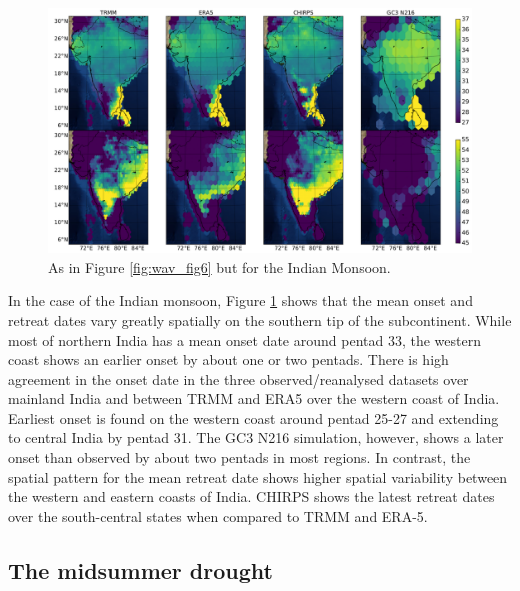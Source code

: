 \begin{figure}
\centering
 \includegraphics[width=\linewidth]{figures/wav_fig9.pdf}
\caption[Onset and retreat dates spatial distribution in Indian monsoon]{ As in Figure \ref{fig:wav_fig6} but for the Indian Monsoon.  }
\label{fig:wav_fig9}
\end{figure}

In the case of the Indian monsoon, Figure \ref{fig:wav_fig9} shows that the mean onset and retreat dates vary greatly spatially on the southern tip of the subcontinent. While most of northern India has a mean onset date around pentad 33, the western coast shows an earlier onset by about one or two pentads. There is high agreement in the onset date in the three observed/reanalysed datasets over mainland India and between TRMM and ERA5 over the western coast of India. Earliest onset is found on the western coast around pentad 25-27 and extending to central India by pentad 31. 
The GC3 N216 simulation, however, shows a later onset than observed by about two pentads in most regions. In contrast, the spatial pattern for the mean retreat date shows higher spatial variability between the western and eastern coasts of India. CHIRPS shows the latest retreat dates over the south-central states when compared to TRMM and ERA-5. 

\subsection{The midsummer drought}

